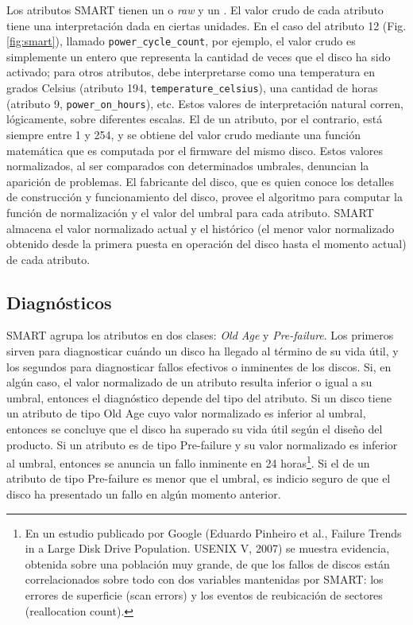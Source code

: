 Los atributos SMART tienen un  o \emph{raw} y un . El valor crudo de cada atributo tiene una interpretación dada en ciertas unidades. En el caso del atributo 12 (Fig. \ref{fig:smart}), llamado \lstinline{power_cycle_count}, por ejemplo, el valor crudo es simplemente un entero que representa la cantidad de veces que el disco ha sido activado; para otros atributos, debe interpretarse como una temperatura en grados Celsius (atributo 194,  \lstinline{temperature_celsius}), una cantidad de horas (atributo 9, \lstinline{power_on_hours}), etc. Estos valores de interpretación natural corren, lógicamente, sobre diferentes escalas. El  de un atributo, por el contrario, está siempre entre 1 y 254, y se obtiene del valor crudo mediante una función matemática que es computada por el firmware del mismo disco. Estos valores normalizados, al ser comparados con determinados umbrales, denuncian la aparición de problemas. El fabricante del disco, que es quien conoce los detalles de construcción y funcionamiento del disco, provee el algoritmo para computar la función de normalización y el valor del umbral para cada atributo. SMART almacena el valor normalizado actual y el  histórico (el menor valor normalizado obtenido desde la primera puesta en operación del disco hasta el momento actual) de cada atributo. 

\subsection{Diagnósticos}
SMART agrupa los atributos en dos clases: \emph{Old Age} y \emph{Pre-failure}. Los primeros sirven para diagnosticar cuándo un disco ha llegado al término de su vida útil, y los segundos para diagnosticar fallos efectivos o inminentes de los discos.
Si, en algún caso, el valor normalizado de un atributo resulta inferior o igual a su umbral, entonces el diagnóstico depende del tipo del atributo. Si un disco tiene un atributo de tipo Old Age cuyo valor normalizado es inferior al umbral, entonces se concluye que el disco ha superado su vida útil según el diseño del producto. Si un atributo es de tipo Pre-failure y su valor normalizado es inferior al umbral, entonces se anuncia un fallo inminente en 24 horas\footnote{En un estudio publicado por Google (Eduardo Pinheiro et al., Failure Trends in a Large Disk Drive Population. USENIX V, 2007) se muestra evidencia, obtenida sobre una población muy grande, de que los fallos de discos están correlacionados sobre todo con dos variables mantenidas por SMART: los errores de superficie (scan errors) y los eventos de reubicación de sectores (reallocation count).}. Si el   de un atributo de tipo Pre-failure es menor que el umbral, es indicio seguro de que el disco ha presentado un fallo en algún momento anterior.


